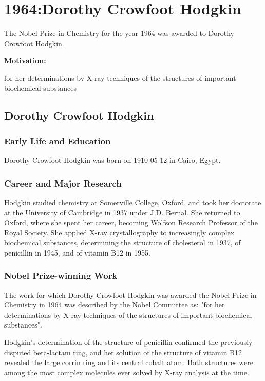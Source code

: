 \chapter{1964:Dorothy Crowfoot Hodgkin}

\label{chap:chemistry1964}

The Nobel Prize in Chemistry for the year 1964 was awarded to Dorothy Crowfoot Hodgkin.

\textbf{Motivation:}

for her determinations by X-ray techniques of the structures of important biochemical substances

\section{Dorothy Crowfoot Hodgkin}

\subsection*{Early Life and Education}

Dorothy Crowfoot Hodgkin was born on 1910-05-12 in Cairo, Egypt.

\subsection*{Career and Major Research}

Hodgkin studied chemistry at Somerville College, Oxford, and took her doctorate at the University of Cambridge in 1937 under J.D. Bernal. She returned to Oxford, where she spent her career, becoming Wolfson Research Professor of the Royal Society. She applied X-ray crystallography to increasingly complex biochemical substances, determining the structure of cholesterol in 1937, of penicillin in 1945, and of vitamin B12 in 1955.

\subsection*{Nobel Prize-winning Work}

The work for which Dorothy Crowfoot Hodgkin was awarded the Nobel Prize in Chemistry in 1964 was described by the Nobel Committee as: "for her determinations by X-ray techniques of the structures of important biochemical substances".

Hodgkin's determination of the structure of penicillin confirmed the previously disputed beta-lactam ring, and her solution of the structure of vitamin B12 revealed the large corrin ring and its central cobalt atom. Both structures were among the most complex molecules ever solved by X-ray analysis at the time.

